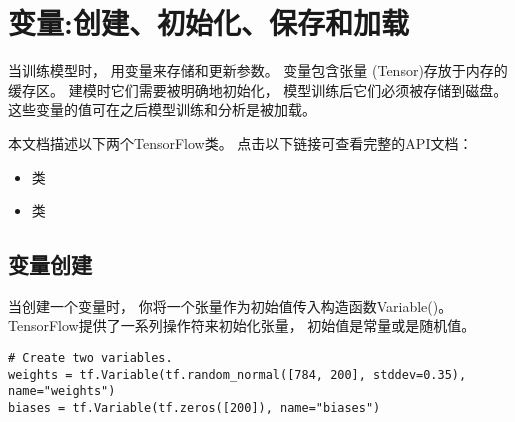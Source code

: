




\section{变量:创建、初始化、保存和加载}
\label{variables}

当训练模型时， 用变量来存储和更新参数。  变量包含张量 (Tensor)存放于内存的缓存区。  建模时它们需要被明确地初始化， 模型训练后它们必须被存储到磁盘。  这些变量的值可在之后模型训练和分析是被加载。

本文档描述以下两个TensorFlow类。  点击以下链接可查看完整的API文档：
\begin{itemize}
  \item {} 类 %
  \item {} 类 %
\end{itemize}

\subsection {变量创建}

当创建一个变量时， 你将一个张量作为初始值传入构造函数Variable()。  TensorFlow提供了一系列操作符来初始化张量， 初始值是常量或是随机值。

\begin{lstlisting}
# Create two variables.
weights = tf.Variable(tf.random_normal([784, 200], stddev=0.35), name="weights")
biases = tf.Variable(tf.zeros([200]), name="biases")
\end{lstlisting}

